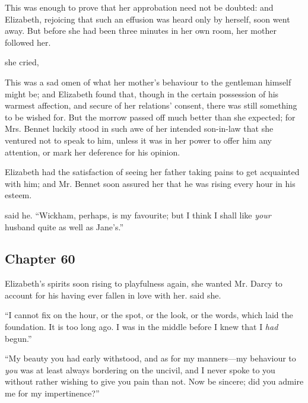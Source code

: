 This was enough to prove that her approbation need not be doubted: and Elizabeth, rejoicing that such an effusion was heard only by herself, soon went away. But before she had been three minutes in her own room, her mother followed her.

 she cried, 

This was a sad omen of what her mother's behaviour to the gentleman himself might be; and Elizabeth found that, though in the certain possession of his warmest affection, and secure of her relations' consent, there was still something to be wished for. But the morrow passed off much better than she expected; for Mrs. Bennet luckily stood in such awe of her intended son-in-law that she ventured not to speak to him, unless it was in her power to offer him any attention, or mark her deference for his opinion.

Elizabeth had the satisfaction of seeing her father taking pains to get acquainted with him; and Mr. Bennet soon assured her that he was rising every hour in his esteem.

 said he. “Wickham, perhaps, is my favourite; but I think I shall like {\em your} husband quite as well as Jane's.”

\subsection[chapter-60]{\useURL[url60][][][]\from[url60] Chapter 60}

Elizabeth's spirits soon rising to playfulness again, she wanted Mr. Darcy to account for his having ever fallen in love with her.  said she. 

“I cannot fix on the hour, or the spot, or the look, or the words, which laid the foundation. It is too long ago. I was in the middle before I knew that I {\em had} begun.”

“My beauty you had early withstood, and as for my manners---my behaviour to {\em you} was at least always bordering on the uncivil, and I never spoke to you without rather wishing to give you pain than not. Now be sincere; did you admire me for my impertinence?”

